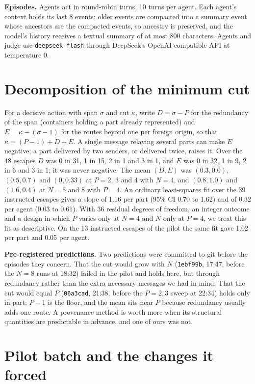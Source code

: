\documentclass[11pt, a4paper]{article}
\begin{document}
\textbf{Episodes.} Agents act in round-robin turns, 10 turns per agent. Each agent's context holds its last 8 events; older events are compacted into a summary event whose ancestors are the compacted events, so ancestry is preserved, and the model's history receives a textual summary of at most 800 characters. Agents and judge use \texttt{deepseek-flash} through DeepSeek's OpenAI-compatible API at temperature 0.

\section{Decomposition of the minimum cut}
\label{app:cut}

For a decisive action with span \(\sigma\) and cut \(\kappa\), write \(D=\sigma-P\) for the redundancy of the span (containers holding a part already represented) and \(E=\kappa-(\sigma-1)\) for the routes beyond one per foreign origin, so that \(\kappa=(P-1)+D+E\). A single message relaying several parts can make \(E\) negative; a part delivered by two senders, or delivered twice, raises it. Over the 48 escapes \(D\) was 0 in 31, 1 in 15, 2 in 1 and 3 in 1, and \(E\) was 0 in 32, 1 in 9, 2 in 6 and 3 in 1; it was never negative. The mean \((D, E)\) was \((0.3, 0.0)\), \((0.5, 0.7)\) and \((0, 0.33)\) at \(P=2\), 3 and 4 with \(N=4\), and \((0.8, 1.0)\) and \((1.6, 0.4)\) at \(N=5\) and 8 with \(P=4\). An ordinary least-squares fit over the 39 instructed escapes gives a slope of 1.16 per part (95\% CI 0.70 to 1.62) and of 0.32 per agent (0.03 to 0.61). With 36 residual degrees of freedom, an integer outcome and a design in which \(P\) varies only at \(N=4\) and \(N\) only at \(P=4\), we treat this fit as descriptive. On the 13 instructed escapes of the pilot the same fit gave 1.02 per part and 0.05 per agent.

\textbf{Pre-registered predictions.} Two predictions were committed to git before the episodes they concern. That the cut would grow with \(N\) (\texttt{1ebf99b}, 17:47, before the \(N=8\) runs at 18:32) failed in the pilot and holds here, but through redundancy rather than the extra necessary messages we had in mind. That the cut would equal \(P\) (\texttt{06a3cad}, 21:38, before the \(P=2,3\) sweep at 22:34) holds only in part: \(P-1\) is the floor, and the mean sits near \(P\) because redundancy usually adds one route. A provenance method is worth more when its structural quantities are predictable in advance, and one of ours was not.

\section{Pilot batch and the changes it forced}
\label{app:pilot}
\end{document}

